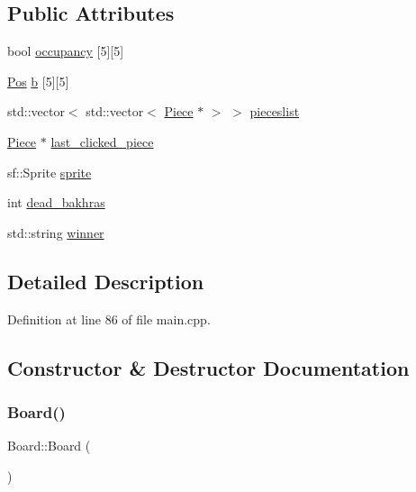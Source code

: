 \subsection*{Public Attributes}
\begin{DoxyCompactItemize}
\item 
bool \mbox{\hyperlink{class_board_a60287104e28c94cbc118266bd30cf407}{occupancy}} \mbox{[}5\mbox{]}\mbox{[}5\mbox{]}
\item 
\mbox{\hyperlink{main_8cpp_a1fee34cd51bd05e4c433a7e94ed397db}{Pos}} \mbox{\hyperlink{class_board_a13f6c1dda93fa552f0620b7c0867df4e}{b}} \mbox{[}5\mbox{]}\mbox{[}5\mbox{]}
\item 
std\+::vector$<$ std\+::vector$<$ \mbox{\hyperlink{class_piece}{Piece}} $\ast$ $>$ $>$ \mbox{\hyperlink{class_board_a1f0cd782b34c4facdb9210e5c3982cba}{pieceslist}}
\item 
\mbox{\hyperlink{class_piece}{Piece}} $\ast$ \mbox{\hyperlink{class_board_ad109cf70d4d3d8cb6ea505cdfe3a3bb6}{last\+\_\+clicked\+\_\+piece}}
\item 
sf\+::\+Sprite \mbox{\hyperlink{class_board_a5f44ad90ccf01fa76ed8095b39f23b9d}{sprite}}
\item 
int \mbox{\hyperlink{class_board_ab9b098ed92381fadccbdfa1e3cb273e8}{dead\+\_\+bakhras}}
\item 
std\+::string \mbox{\hyperlink{class_board_a6c7f6acc261614facb3768ca8712d9ba}{winner}}
\end{DoxyCompactItemize}


\subsection{Detailed Description}


Definition at line 86 of file main.\+cpp.



\subsection{Constructor \& Destructor Documentation}
\mbox{\label{class_board_a9ee491d4fea680cf69b033374a9fdfcb}} 
\subsubsection{\texorpdfstring{Board()}{Board()}}
{\footnotesize\ttfamily Board\+::\+Board (\begin{DoxyParamCaption}{ }\end{DoxyParamCaption})\hspace{0.3cm}{\ttfamily [inline]}}




